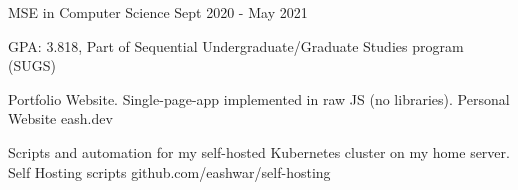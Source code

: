 \documentclass[]{awesome-cv}
\begin{document}
\vspace{-5mm}
\cventry
	{MSE in Computer Science}
	{}
	{}
	{Sept 2020 - May 2021}
	{\begin{cvitems}
		\item{GPA: 3.818, Part of Sequential Undergraduate/Graduate Studies program (SUGS)}
		\end{cvitems}}




\vspace{-6mm}
\vspace{-2mm}




	
	\cventry
	{Portfolio Website. Single-page-app implemented in raw JS (no libraries).}
	{Personal Website}
	{eash.dev}
	{}
	{}

	\vspace{-6mm}
	\cventry
	{Scripts and automation for my self-hosted Kubernetes cluster on my home server.}
	{Self Hosting scripts}
	{github.com/eashwar/self-hosting}
	{}
	{}
\end{document}
